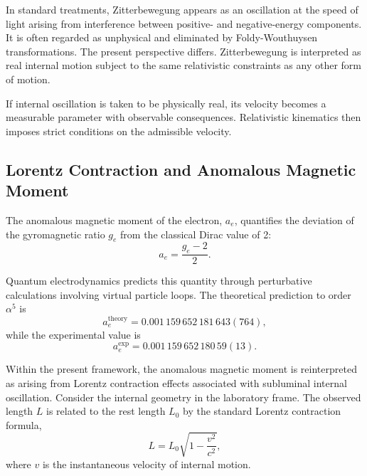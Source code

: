 \documentclass[%
 reprint,
 amsmath,amssymb,
 aps,
 prb,
]{revtex4-2}
\numberwithin{equation}{section}
\begin{document}
In standard treatments, Zitterbewegung appears as an oscillation at the speed of light arising from interference between positive- and negative-energy components. It is often regarded as unphysical and eliminated by Foldy-Wouthuysen transformations. The present perspective differs. Zitterbewegung is interpreted as real internal motion subject to the same relativistic constraints as any other form of motion.

If internal oscillation is taken to be physically real, its velocity becomes a measurable parameter with observable consequences. Relativistic kinematics then imposes strict conditions on the admissible velocity.


\subsection{Lorentz Contraction and Anomalous Magnetic Moment}
\label{subsec:lorentz_contraction}

The anomalous magnetic moment of the electron, $a_e$, quantifies the deviation of the gyromagnetic ratio $g_e$ from the classical Dirac value of 2:
\begin{equation}
a_e = \frac{g_e - 2}{2}.
\label{eq:anomalous_moment_def}
\end{equation}

Quantum electrodynamics predicts this quantity through perturbative calculations involving virtual particle loops. The theoretical prediction to order $\alpha^5$ is~\cite{QED_Theory}
\begin{equation}
a_e^{\mathrm{theory}} = 0.001\,159\,652\,181\,643(764),
\label{eq:a_e_theory}
\end{equation}
while the experimental value is~\cite{Hanneke2008}
\begin{equation}
a_e^{\mathrm{exp}} = 0.001\,159\,652\,180\,59(13).
\label{eq:a_e_exp}
\end{equation}

Within the present framework, the anomalous magnetic moment is reinterpreted as arising from Lorentz contraction effects associated with subluminal internal oscillation. Consider the internal geometry in the laboratory frame. The observed length $L$ is related to the rest length $L_0$ by the standard Lorentz contraction formula,
\begin{equation}
L = L_0 \sqrt{1 - \frac{v^2}{c^2}},
\label{eq:lorentz_contraction}
\end{equation}
where $v$ is the instantaneous velocity of internal motion.
\end{document}
